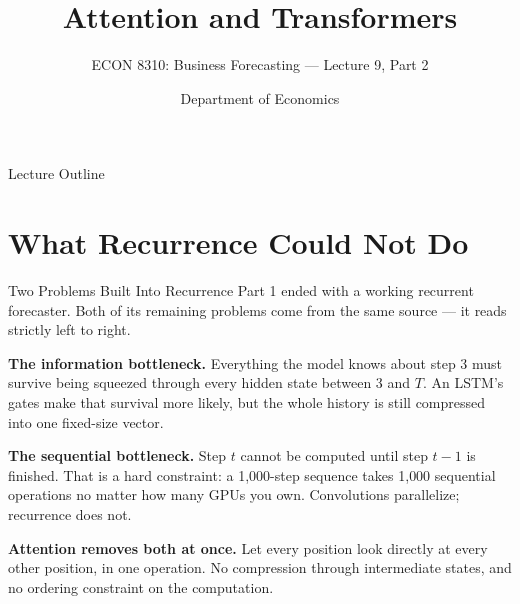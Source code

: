 \documentclass[aspectratio=169, 11pt]{beamer}
\title[Transformers]{Attention and Transformers}
\subtitle{ECON 8310: Business Forecasting --- Lecture 9, Part 2}
\author{Department of Economics}
\institute{University of Nebraska at Omaha}
\begin{document}

\begin{frame}
  \titlepage
\end{frame}

\begin{frame}{Lecture Outline}
  \tableofcontents
\end{frame}

\section{What Recurrence Could Not Do}


\begin{frame}{Two Problems Built Into Recurrence}
  Part 1 ended with a working recurrent forecaster. Both of its remaining problems come from the
  same source --- it reads strictly left to right.

  \vspace{0.15cm}
  \textbf{The information bottleneck.} Everything the model knows about step 3 must survive being
  squeezed through every hidden state between 3 and $T$. An LSTM's gates make that survival more
  likely, but the whole history is still compressed into one fixed-size vector.

  \vspace{0.15cm}
  \textbf{The sequential bottleneck.} Step $t$ cannot be computed until step $t-1$ is finished.
  That is a hard constraint: a 1{,}000-step sequence takes 1{,}000 sequential operations no
  matter how many GPUs you own. Convolutions parallelize; recurrence does not.

  \begin{keybox}
    \textbf{Attention removes both at once.} Let every position look directly at every other
    position, in one operation. No compression through intermediate states, and no ordering
    constraint on the computation.
  \end{keybox}
\end{frame}
\end{document}
